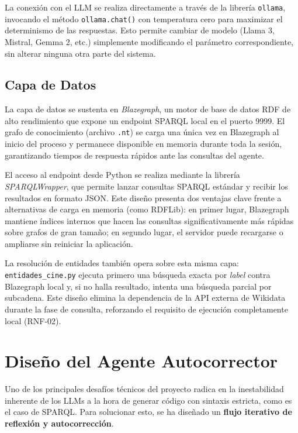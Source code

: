 La conexión con el LLM se realiza directamente a través de la librería \texttt{ollama}, invocando el método \texttt{ollama.chat()} con temperatura cero para maximizar el determinismo de las respuestas. Esto permite cambiar de modelo (Llama 3, Mistral, Gemma 2, etc.) simplemente modificando el parámetro correspondiente, sin alterar ninguna otra parte del sistema.

\subsection{Capa de Datos}

La capa de datos se sustenta en \textit{Blazegraph}, un motor de base de datos RDF de alto rendimiento que expone un endpoint SPARQL local en el puerto 9999. El grafo de conocimiento (archivo \texttt{.nt}) se carga una única vez en Blazegraph al inicio del proceso y permanece disponible en memoria durante toda la sesión, garantizando tiempos de respuesta rápidos ante las consultas del agente.

El acceso al endpoint desde Python se realiza mediante la librería \textit{SPARQLWrapper}, que permite lanzar consultas SPARQL estándar y recibir los resultados en formato JSON. Este diseño presenta dos ventajas clave frente a alternativas de carga en memoria (como RDFLib): en primer lugar, Blazegraph mantiene índices internos que hacen las consultas significativamente más rápidas sobre grafos de gran tamaño; en segundo lugar, el servidor puede recargarse o ampliarse sin reiniciar la aplicación.

La resolución de entidades también opera sobre esta misma capa: \texttt{entidades\_cine.py} ejecuta primero una búsqueda exacta por \textit{label} contra Blazegraph local y, si no halla resultado, intenta una búsqueda parcial por subcadena. Este diseño elimina la dependencia de la API externa de Wikidata durante la fase de consulta, reforzando el requisito de ejecución completamente local (RNF-02).

\section{Diseño del Agente Autocorrector}

Uno de los principales desafíos técnicos del proyecto radica en la inestabilidad inherente de los LLMs a la hora de generar código con sintaxis estricta, como es el caso de SPARQL. Para solucionar esto, se ha diseñado un \textbf{flujo iterativo de reflexión y autocorrección}.

